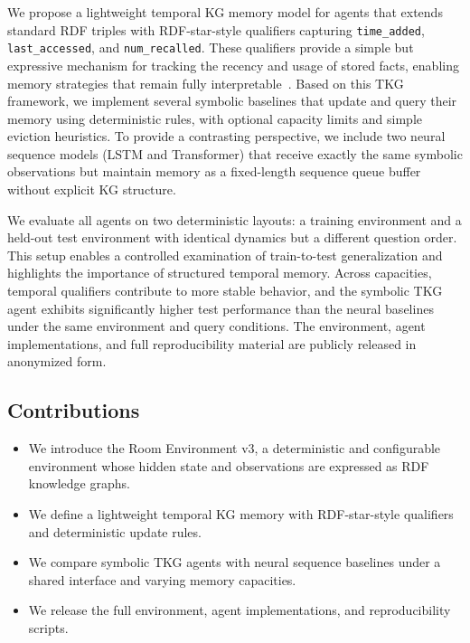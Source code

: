 \documentclass[11pt]{article}
\begin{document}
We propose a lightweight temporal KG memory model for agents that
extends standard RDF triples with RDF-star-style qualifiers capturing
\texttt{time\_added}, \texttt{last\_accessed}, and
\texttt{num\_recalled}. These qualifiers provide a simple but expressive
mechanism for tracking the recency and usage of stored facts, enabling
memory strategies that remain fully interpretable~\cite{10.1145/2452376.2452478}. Based on this TKG
framework, we implement several symbolic baselines that update and query
their memory using deterministic rules, with optional capacity limits
and simple eviction heuristics. To provide a contrasting perspective, we
include two neural sequence models (LSTM and Transformer) that receive exactly the same symbolic observations but maintain memory as a fixed-length sequence
queue buffer without explicit KG structure.

We evaluate all agents on two deterministic layouts: a training
environment and a held-out test environment with identical dynamics but
a different question order. This setup enables a controlled examination
of train-to-test generalization and highlights the importance of
structured temporal memory. Across capacities, temporal qualifiers
contribute to more stable behavior, and the symbolic TKG agent exhibits
significantly higher test performance than the neural baselines under the same environment and query conditions. The environment, agent implementations,
and full reproducibility material are publicly released in anonymized
form.

\subsection*{Contributions}

\begin{itemize}
    \item We introduce the Room Environment v3, a deterministic and configurable environment
        whose hidden state and observations are expressed as RDF knowledge graphs.
    \item We define a lightweight temporal KG memory with RDF-star-style
    qualifiers and deterministic update rules.
    \item We compare symbolic TKG agents with neural sequence baselines
    under a shared interface and varying memory capacities.
    \item We release the full environment, agent implementations, and
    reproducibility scripts.
\end{itemize}
\end{document}
